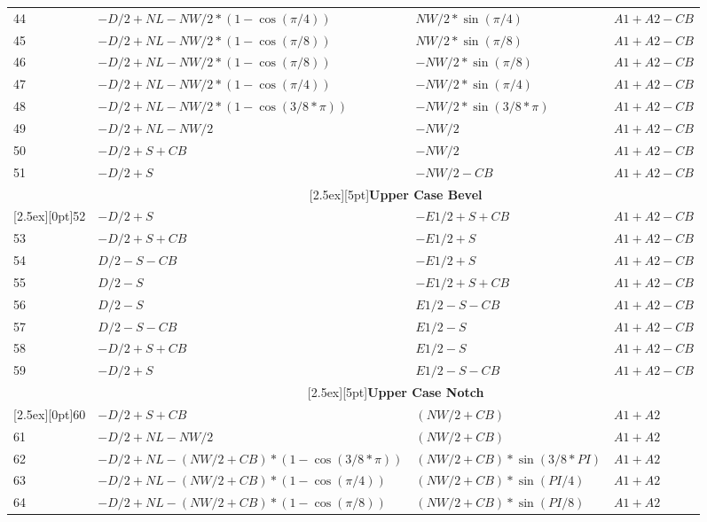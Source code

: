 \documentclass[a4paper, dvipdfm]{article}
\begin{document}
\begin{longtable}{|l|l|l|l|}
44 & $-D/2+NL-NW/2*(1-\cos(\pi/4))$   & $NW/2*\sin(\pi/4)$    & $A1+A2-CB$\\
45 & $-D/2+NL-NW/2*(1-\cos(\pi/8))$   & $NW/2*\sin(\pi/8)$    & $A1+A2-CB$\\
46 & $-D/2+NL-NW/2*(1-\cos(\pi/8))$   & $-NW/2*\sin(\pi/8)$   & $A1+A2-CB$\\
47 & $-D/2+NL-NW/2*(1-\cos(\pi/4))$   & $-NW/2*\sin(\pi/4)$   & $A1+A2-CB$\\
48 & $-D/2+NL-NW/2*(1-\cos(3/8*\pi))$ & $-NW/2*\sin(3/8*\pi)$ & $A1+A2-CB$\\
49 & $-D/2+NL-NW/2$                   & $-NW/2$               & $A1+A2-CB$\\
50 & $-D/2 + S + CB$                  & $-NW/2$               & $A1+A2-CB$\\
51 & $-D/2 + S$                       & $-NW/2 - CB$          & $A1+A2-CB$\\
\hline
&\multicolumn{3}{|c|}{\raisebox{0pt}[2.5ex][5pt]{\textbf{Upper Case Bevel}}}\\\cline{2-4}
\raisebox{0pt}[2.5ex][0pt]{52}
   & $-D/2+S$    & $-E1/2+S+CB$ & $A1+A2-CB$\\
53 & $-D/2+S+CB$ & $-E1/2+S$    & $A1+A2-CB$\\
54 & $D/2-S-CB$  & $-E1/2+S$    & $A1+A2-CB$\\
55 & $D/2-S$     & $-E1/2+S+CB$ & $A1+A2-CB$\\
56 & $D/2-S$     & $E1/2-S-CB$  & $A1+A2-CB$\\
57 & $D/2-S-CB$  & $E1/2-S$     & $A1+A2-CB$\\
58 & $-D/2+S+CB$ & $E1/2-S$     & $A1+A2-CB$\\
59 & $-D/2+S$    & $E1/2-S-CB$  & $A1+A2-CB$\\
\hline
&\multicolumn{3}{|c|}{\raisebox{0pt}[2.5ex][5pt]{\textbf{Upper Case Notch}}}\\\cline{2-4}
\raisebox{0pt}[2.5ex][0pt]{60}
   & $-D/2 + S + CB$                             & $(NW/2 + CB)$               & $A1+A2$\\
61 & $-D/2 + NL - NW/2$                          & $(NW/2 + CB)$               & $A1+A2$\\
62 & $-D/2 + NL - (NW/2 + CB)*(1-\cos(3/8*\pi))$ & $(NW/2 + CB)*\sin(3/8*PI)$  & $A1+A2$\\
63 & $-D/2 + NL - (NW/2 + CB)*(1-\cos(\pi/4))$   & $(NW/2 + CB)*\sin(PI/4)$    & $A1+A2$\\
64 & $-D/2 + NL - (NW/2 + CB)*(1-\cos(\pi/8))$   & $(NW/2 + CB)*\sin(PI/8)$    & $A1+A2$\\

\end{longtable}
\end{document}
